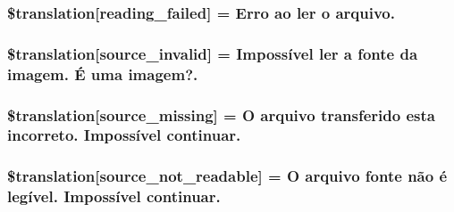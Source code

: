 \subsubsection[{\$translation}]{\setlength{\rightskip}{0pt plus 5cm}\$translation\mbox{[}\textquotesingle{}reading\+\_\+failed\textquotesingle{}\mbox{]} = \textquotesingle{}Erro ao ler o arquivo.\textquotesingle{}}\label{class_8upload_8pt___b_r_8php_a01bea14c9fd5f353f62db44beabfcd42}
\hypertarget{class_8upload_8pt___b_r_8php_a6ab0a660b457eaf2d3434b225449fdd6}{}
\subsubsection[{\$translation}]{\setlength{\rightskip}{0pt plus 5cm}\$translation\mbox{[}\textquotesingle{}source\+\_\+invalid\textquotesingle{}\mbox{]} = \textquotesingle{}Impossível ler a fonte da imagem. É uma imagem?.\textquotesingle{}}\label{class_8upload_8pt___b_r_8php_a6ab0a660b457eaf2d3434b225449fdd6}
\hypertarget{class_8upload_8pt___b_r_8php_aceaaf7355acaaf10f0ae60378d03c468}{}
\subsubsection[{\$translation}]{\setlength{\rightskip}{0pt plus 5cm}\$translation\mbox{[}\textquotesingle{}source\+\_\+missing\textquotesingle{}\mbox{]} = \textquotesingle{}O arquivo transferido esta incorreto. Impossível continuar.\textquotesingle{}}\label{class_8upload_8pt___b_r_8php_aceaaf7355acaaf10f0ae60378d03c468}
\hypertarget{class_8upload_8pt___b_r_8php_a922967ca2df0efdd455261142d8e5715}{}
\subsubsection[{\$translation}]{\setlength{\rightskip}{0pt plus 5cm}\$translation\mbox{[}\textquotesingle{}source\+\_\+not\+\_\+readable\textquotesingle{}\mbox{]} = \textquotesingle{}O arquivo fonte não é legível. Impossível continuar.\textquotesingle{}}\label{class_8upload_8pt___b_r_8php_a922967ca2df0efdd455261142d8e5715}
\hypertarget{class_8upload_8pt___b_r_8php_a2baece8da11e20d45175db91851ec3e3}{}
